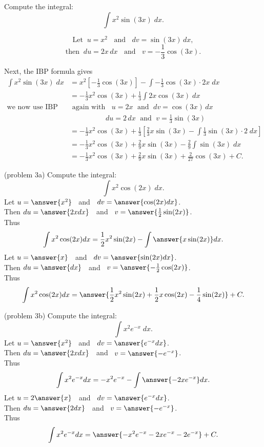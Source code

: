 \documentclass{ximera}
\begin{document}
\begin{example}
Compute the integral:
  \[
  \int x^2\sin(3x) \;dx.
  \]

\[
\text{Let} \;\; u = x^2 \;\; \text{   and   } \;\; dv = \sin(3x) \,dx,
\]
\[
\text{then} \;\; du = 2x \,dx \;\; \text{   and   } \;\; v = -\frac13 \cos(3x).
\]

Next, the IBP formula gives
\begin{align*}
\int x^2\sin(3x) \;dx &= x^2\left[-\frac13 \cos(3x)\right] - \int -\frac13 \cos(3x) \cdot 2x \; dx \\
                       &= -\frac13 x^2\cos(3x) + \frac13 \int 2x\cos(3x) \; dx\\                               
\text{we now use IBP} & \text{  again with  } \;\; u = 2x \;\text{  and  } \; dv = \cos(3x) \, dx\\
& \qquad \qquad \quad du = 2 \, dx \; \text{ and } \; v=\frac13 \sin(3x)\\
                       &= -\frac13 x^2\cos(3x) + \frac13\left[\frac23x\sin(3x) -  \int \frac13 \sin(3x)\cdot 2 \; dx\right]\\
                       &= -\frac13 x^2\cos(3x) + \frac29x\sin(3x) - \frac29 \int  \sin(3x) \; dx\\
                       &= -\frac13 x^2\cos(3x) + \frac29x\sin(3x) + \frac{2}{27} \cos(3x) + C.
\end{align*}

\end{example}


\begin{problem}(problem 3a)
Compute the integral:
  \[
  \int x^2\cos(2x) \;dx.
  \]
Let $u = \answer{x^2}\;\;$   and   $\;\;dv = \answer{\cos(2x) dx}$.\\
  Then $du = \answer{2x dx}\;\;$   and   $\;\;v = \answer{\frac12 \sin(2x)}$.\\
  Thus 
  \[
  \int x^2 \cos(2x) dx = \frac12 x^2 \sin(2x) -\int \answer{x \sin(2x)} dx.
  \]
Let $u = \answer{x}\;\;$   and   $\;\;dv = \answer{\sin(2x) dx}$.\\
  Then $du = \answer{dx}\;\;$   and   $\;\;v = \answer{-\frac12 \cos(2x)}$.\\ 
Thus 
  \[
  \int x^2 \cos(2x) dx = \answer{\frac12 x^2 \sin(2x) + \frac12 x \cos(2x) - \frac14 \sin(2x)} + C.
  \]  

\end{problem}

\begin{problem}(problem 3b)
Compute the integral:
  \[
  \int x^2e^{-x} \;dx.
  \]
Let $u = \answer{x^2}\;\;$   and   $\;\;dv = \answer{e^{-x} dx}$.\\
  Then $du = \answer{2x dx}\;\;$   and   $\;\;v = \answer{-e^{-x}}$.\\
  Thus 
  \[
  \int x^2 e^{-x} dx = -x^2 e^{-x} -\int \answer{-2xe^{-x}} dx.
  \]
Let $u = 2\answer{x}\;\;$   and   $\;\;dv = \answer{e^{-x} dx}$.\\
  Then $du = \answer{2 dx}\;\;$   and   $\;\;v = \answer{-e^{-x}}$.\\ 
Thus 
  \[
  \int x^2 e^{-x} dx = \answer{-x^2 e^{-x} - 2xe^{-x} - 2e^{-x}} + C.
  \]  
\end{problem}
\end{document}
